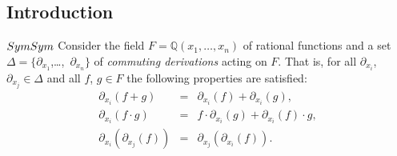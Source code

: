 
\newcommand{\Sym}{\operatorname{Sym}}
\newenvironment{reduce}{\begin{scriptsize}\begin{verbatim}}%
{\end{verbatim}\end{scriptsize}}

\newenvironment{ebnf}{\begin{tabular}{rcll}}{\end{tabular}}
\newcommand{\ebnfvar}[1]{{\textit{#1}}\ \ }
\newcommand{\ebnfvara}[1]{$\langle$\textit{#1}$\rangle$\ \ }
\newcommand{\ebnfor}{\textrm{\ $|$\ \ }}
\newcommand{\ebnfterm}[1]{\textrm{\textbf{\texttt{#1}}}\ \ }
\newcommand{\ebnfoption}[1]{\textrm{$[\;$#1$\;]$}\ \ }
\newcommand{\ebnfmult}[1]{\textrm{$\{\;$#1$\;\}$}\ \ }
\newcommand{\ebnfattrib}[1]{{$\bigl\{$\ {#1}\ $\bigr\}$}\ \ }

\newcommand{\ebnfrule}[2]{{#1}&$\ \ \rightarrow\ \ $&{#2}&\\}
\newcommand{\ebnfrulev}[2]{{\ebnfvar{#1}}&$\ \ \rightarrow\ \ $&{#2}&\\}
\newcommand{\ebnfhalfrule}[1]{&&{\ebnfor {#1}}&\\}
\newcommand{\ebnfrulea}[3]{{#1}&$\ \ \rightarrow\ \ $&{#2}&{$\bigl\{$\ {#3}\ $\bigr\}$}\\}
\newcommand{\ebnfruleav}[3]{{\ebnfvar{#1}}&$\ \ \rightarrow\ \ $&{#2}&{$\bigl\{$\ {#3}\ $\bigr\}$}\\}
\newcommand{\ebnfhalfrulea}[2]{&&{\ebnfor {#1}}&{$\bigl\{$\ {#2}\ $\bigr\}$}\\}

\newcommand{\ebnfsinglerulev}[2]{\textrm{{\ebnfvar{#1}}$\ \ \rightarrow\ \ ${#2}\\}}
\newcommand{\ebnfsinglerule}[2]{\textrm{{#1}$\ \ \rightarrow\ \ ${#2}\\}}
\newcommand{\ebnfsingleruleav}[3]{\textrm{{\ebnfvar{#1}}$\ \ \rightarrow\ \ ${#2}\ \ \ $\bigl\{$\ {#3}\ $\bigr\}$\\}}
\newcommand{\ebnfsinglerulea}[3]{\textrm{{#1}$\ \ \rightarrow\ \ ${#2}\ \
    \ $\bigl\{$\ {#3}\ $\bigr\}$\\}}


\subsection{Introduction}
\ifdefined\HCode
\(
\def\Sym{\operatorname{Sym}}
\)%
\fi
Consider the field $F = \mathbb{Q}(x_1,\dots,x_n)$ of rational functions and a
set $\Delta = \{\partial_{x_1}$,\dots,~$\partial_{x_n}\}$ of
\emph{commuting derivations} acting on $F$. That is, for all
$\partial_{x_i}$, $\partial_{x_j} \in \Delta$ and all $f$, $g\in F$
the following properties are satisfied:
\begin{eqnarray}
\partial_{x_i}(f + g) &=& \partial_{x_i}(f) + \partial_{x_i}(g),\nonumber\\
\partial_{x_i}(f\cdot g) &=& f\cdot\partial_{x_i}(g)
  + \partial_{x_i}(f)\cdot g,\label{EQ:leibnitz}\\
\partial_{x_i}(\partial_{x_j}(f)) &=& \partial_{x_j}(\partial_{x_i}(f)).\label{EQ:comm}
\end{eqnarray}

